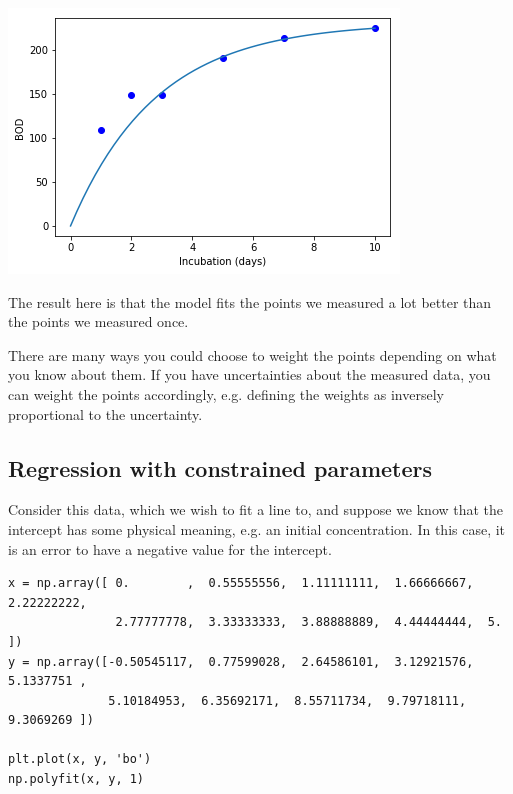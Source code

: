 \documentclass[11pt]{article}
\begin{document}
\begin{center}
\includegraphics[width=.9\linewidth]{obipy-resources/37c51028cef42d76546d882661b04271-20264nhi.png}
\end{center}

The result here is that the model fits the points we measured a lot better than the points we measured once.



There are many ways you could choose to weight the points depending on what you know about them. If you have uncertainties about the measured data, you can weight the points accordingly, e.g. defining the weights as inversely proportional to the uncertainty.
\subsection{Regression with constrained parameters}
\label{sec:orgde348f1}

Consider this data, which we wish to fit a line to, and suppose we know that the intercept has some physical meaning, e.g. an initial concentration. In this case, it is an error to have a negative value for the intercept.

\begin{verbatim}
x = np.array([ 0.        ,  0.55555556,  1.11111111,  1.66666667,  2.22222222,
               2.77777778,  3.33333333,  3.88888889,  4.44444444,  5.        ])
y = np.array([-0.50545117,  0.77599028,  2.64586101,  3.12921576,  5.1337751 ,
              5.10184953,  6.35692171,  8.55711734,  9.79718111,  9.3069269 ])

plt.plot(x, y, 'bo')
np.polyfit(x, y, 1)
\end{verbatim}
\end{document}
